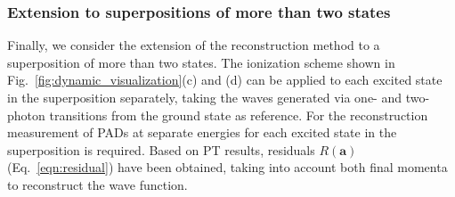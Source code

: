 \subsubsection{Extension to superpositions of more than two states}

Finally, we consider the extension of the reconstruction method to a superposition of more than two states. The ionization scheme shown in Fig.\ \ref{fig:dynamic_visualization}(c) and (d) can be applied to each excited state in the superposition separately, taking the waves generated via one- and two-photon transitions from the ground state as reference. For the reconstruction measurement of PADs at separate energies for each excited state in the superposition is required. Based on PT results, residuals $R(\mathbf{a})$ (Eq.\ \ref{eqn:residual}) have been obtained, taking into account both final momenta to reconstruct the wave function.

